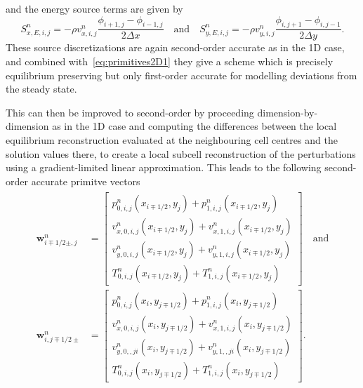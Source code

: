 and the energy source terms are given by
\begin{equation}
S_{x,E,i,j}^n=-\rho v_{x,i,j}^n\frac{\phi_{i+1,j}-\phi_{i-1,j}}{2\Delta x} \quad \textrm{and} \quad S_{y,E,i,j}^n=-\rho v_{y,i,j}^n\frac{\phi_{i,j+1}-\phi_{i,j-1}}{2\Delta y}.
\end{equation}
These source discretizations are again second-order accurate as in the 1D case, and combined with~\eqref{eq:primitives2D1} they give a scheme which is precisely equilibrium preserving but only first-order accurate for modelling deviations from the steady state.

This can then be improved to second-order by proceeding dimension-by-dimension as in the 1D case and computing the differences between the local equilibrium reconstruction evaluated at the neighbouring cell centres and the solution values there, to create a local subcell reconstruction of the perturbations using a gradient-limited linear approximation. This leads to the following second-order accurate primitve vectors
\begin{align} \label{eq:primitives2D2}
\begin{split}
\mathbf{w}_{i\mp1/2\pm,j}^n&=
\begin{bmatrix}
p_{0,i,j}^n(x_{i\mp1/2},y_j)+p_{1,i,j}^n(x_{i\mp1/2},y_j) \\ v_{x,0,i,j}^n(x_{i\mp1/2},y_j)+v_{x,1,i,j}^n(x_{i\mp1/2},y_j) \\ v_{y,0,i,j}^n(x_{i\mp1/2},y_j)+v_{y,1,i,j}^n(x_{i\mp1/2},y_j) \\ T_{0,i,j}^n(x_{i\mp1/2},y_j)+T_{1,i,j}^n(x_{i\mp1/2},y_j)
\end{bmatrix} \quad \textrm{and} \\
\mathbf{w}_{i,j\mp1/2\pm}^n&=
\begin{bmatrix}
p_{0,i,j}^n(x_i,y_{j\mp1/2})+p_{1,i,j}^n(x_i,y_{j\mp1/2}) \\ v_{x,0,i,j}^n(x_i,y_{j\mp1/2})+v_{x,1,i,j}^n(x_i,y_{j\mp1/2}) \\ v_{y,0,,ji}^n(x_i,y_{j\mp1/2})+v_{y,1,,ji}^n(x_i,y_{j\mp1/2}) \\ T_{0,i,j}^n(x_i,y_{j\mp1/2})+T_{1,i,j}^n(x_i,y_{j\mp1/2})
\end{bmatrix}.
\end{split}
\end{align}
